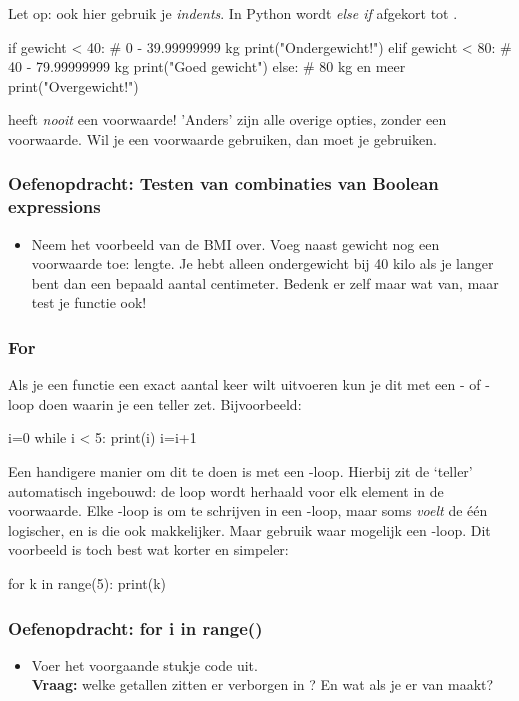 \documentclass[a4paper,11pt, fleqn]{article}
\begin{document}
Let op: ook hier gebruik je \textit{indents}. In Python wordt \textit{else if} afgekort tot . 

\begin{python}
if gewicht < 40:            # 0 - 39.99999999 kg
    print("Ondergewicht!")
elif gewicht < 80:          # 40 - 79.99999999 kg
    print("Goed gewicht")
else:                       # 80 kg en meer
    print("Overgewicht!")
\end{python}

 heeft {\it nooit} een voorwaarde! 'Anders' zijn alle overige opties, zonder een voorwaarde. Wil je een voorwaarde gebruiken, dan moet je  gebruiken.


\subsubsection*{Oefenopdracht: Testen van combinaties van Boolean expressions} 
\begin{itemize}
	\item Neem het voorbeeld van de BMI over. Voeg naast gewicht nog een voorwaarde toe: lengte. Je hebt alleen ondergewicht bij 40 kilo als je langer bent dan een bepaald aantal centimeter. Bedenk er zelf maar wat van, maar test je functie ook!
\end{itemize}

\subsubsection{For}
Als je een functie een exact aantal keer wilt uitvoeren kun je dit met een - of -loop doen waarin je een teller zet. Bijvoorbeeld:
\begin{python}
i=0
while i < 5:
    print(i)
    i=i+1
\end{python}
Een handigere manier om dit te doen is met een -loop. Hierbij zit de `teller' automatisch ingebouwd: de loop wordt herhaald voor elk element in de voorwaarde. Elke -loop is om te schrijven in een -loop, maar soms \textit{voelt} de \'e\'en logischer, en is die ook makkelijker. Maar gebruik waar mogelijk een -loop. Dit voorbeeld is toch best wat korter en simpeler:

\begin{python}
for k in range(5):
    print(k)
\end{python}

\subsubsection*{Oefenopdracht: for i in range()}
\begin{itemize}
	\item Voer het voorgaande stukje code uit. \\
	\textbf{Vraag:} welke getallen zitten er verborgen in ? En wat als je er  van maakt?
\end{itemize}
\end{document}

